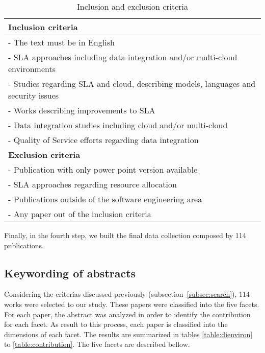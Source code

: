 \begin{table}[!htb]
\begin{center}
\begin{tabular}{p{10cm}}
\bottomrule \hline
\textbf{Inclusion criteria} \\ 
\hline 
- The text must be in English \\ 
- SLA approaches including data integration and/or multi-cloud environments\\
- Studies regarding SLA and cloud, describing models, languages and security issues \\
- Works describing improvements to SLA \\
- Data integration studies including cloud and/or multi-cloud  \\
- Quality of Service efforts regarding data integration \\
\bottomrule \hline 
\textbf{Exclusion criteria} \\ 
\hline 
- Publication with only power point version available \\ 
- SLA approaches regarding resource allocation \\
- Publications outside of the software engineering area \\
- Any paper out of the inclusion criteria  \\
\bottomrule \hline
\end{tabular} 
\end{center}
\caption{Inclusion and exclusion criteria}\label{table:criteria}
\end{table}

Finally, in the fourth step, we built the final data collection composed by 114 publications.

\subsection{Keywording of abstracts}

Considering the criterias discussed previously (subsection~\ref{subsec:search}),
114 works were selected to our study. 
These papers were classified into the five facets. For each paper, the abstract
was analyzed in order to identify the contribution for each facet.
As result to this process, each paper is classified into the dimensions of each facet. 
The results are summarized in tables \ref{table:dienviron} to \ref{table:contribution}. 
The five facets are described bellow.

